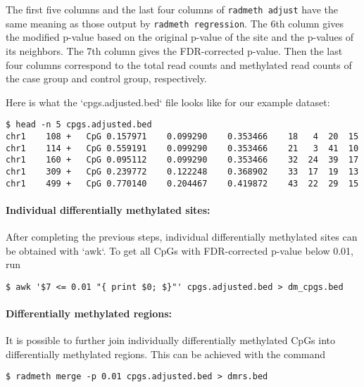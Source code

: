 \documentclass[10pt]{article}
\begin{document}
The first five columns and the last four columns of {\tt radmeth adjust} have
the same meaning as those output by {\tt radmeth regression}. The 6th column
gives the modified p-value based on the original p-value of the site and the
p-values of its neighbors. The 7th column gives the FDR-corrected p-value.
Then the last four columns correspond to the total read counts and 
methylated read counts of the case group and control group, respectively.

Here is what the `cpgs.adjusted.bed` ﬁle looks like for our example dataset:

{\small{%
\begin{verbatim}
$ head -n 5 cpgs.adjusted.bed
chr1	108	+	CpG	0.157971	0.099290	0.353466	18	 4	20	15
chr1	114	+	CpG	0.559191	0.099290	0.353466	21	 3	41	10
chr1	160	+	CpG	0.095112	0.099290	0.353466	32	24	39	17
chr1	309	+	CpG	0.239772	0.122248	0.368902	33	17	19	13
chr1	499	+	CpG	0.770140	0.204467	0.419872	43	22	29	15
\end{verbatim}%
}}

\paragraph{Individual differentially methylated sites:} After completing the 
previous steps, individual differentially methylated sites can be obtained with 
`awk`. To get all CpGs with FDR-corrected p-value below 0.01, run

{\small{%
\begin{verbatim}
$ awk '$7 <= 0.01 "{ print $0; $}"' cpgs.adjusted.bed > dm_cpgs.bed
\end{verbatim}%
}}

\paragraph{Differentially methylated regions:} It is possible to further join 
individually differentially methylated CpGs into differentially methylated 
regions. This can be achieved with the command
{\small{%
\begin{verbatim}
$ radmeth merge -p 0.01 cpgs.adjusted.bed > dmrs.bed
\end{verbatim}%
}}
\end{document}
